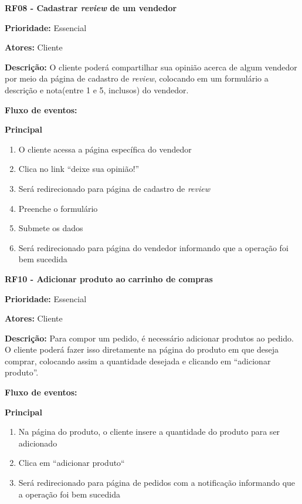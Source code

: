 \textbf{RF08 - Cadastrar \textit{review} de um vendedor} \par
\textbf{Prioridade:} Essencial \par
\textbf{Atores:} Cliente \par
\textbf{Descrição:} O cliente poderá compartilhar sua opinião acerca de algum vendedor por meio da página de cadastro de \textit{review}, colocando em um formulário a descrição e nota(entre 1 e 5, inclusos) do vendedor. \par
\textbf{Fluxo de eventos:} \par
\textbf{Principal} \par
\begin{enumerate}
  \item O cliente acessa a página específica do vendedor
  \item Clica no link “deixe sua opinião!”
  \item Será redirecionado para página de cadastro de \textit{review}
  \item Preenche o formulário
  \item Submete os dados
  \item Será redirecionado para página do vendedor informando que a operação foi bem sucedida
\end{enumerate}

\textbf{RF10 - Adicionar produto ao carrinho de compras} \par
\textbf{Prioridade:} Essencial \par
\textbf{Atores:} Cliente \par
\textbf{Descrição:} Para compor um pedido, é necessário adicionar produtos ao pedido. O cliente poderá fazer isso diretamente na página do produto em que deseja comprar, colocando assim a quantidade desejada e clicando em “adicionar produto”. \par
\textbf{Fluxo de eventos:} \par
\textbf{Principal} \par
\begin{enumerate}
  \item Na página do produto, o cliente insere a quantidade do produto para ser adicionado
  \item Clica em “adicionar produto“
  \item Será redirecionado para página de pedidos com a notificação informando que a operação foi bem sucedida
\end{enumerate}

